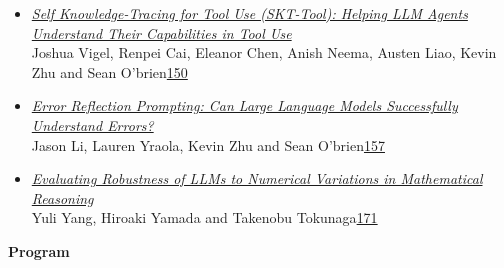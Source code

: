 \documentclass[11pt,oneside]{book}
\begin{document}
\begin{itemize}[leftmargin=*,label={}]
       \item \hyperlink{page.150}{\emph{Self Knowledge-Tracing for Tool Use (SKT-Tool): Helping LLM Agents Understand Their Capabilities in Tool Use}}\\ \hspace*{2em} Joshua Vigel, Renpei Cai, Eleanor Chen, Anish Neema, Austen Liao, Kevin Zhu and Sean O'brien\dotfill \hyperlink{page.150}{150}
       \item \hyperlink{page.157}{\emph{Error Reflection Prompting: Can Large Language Models Successfully Understand Errors?}}\\ \hspace*{2em} Jason Li, Lauren Yraola, Kevin Zhu and Sean O'brien\dotfill \hyperlink{page.157}{157}
       \item \hyperlink{page.171}{\emph{Evaluating Robustness of LLMs to Numerical Variations in Mathematical Reasoning}}\\ \hspace*{2em} Yuli Yang, Hiroaki Yamada and Takenobu Tokunaga\dotfill \hyperlink{page.171}{171}
  \end{itemize}
\newpage

{}
\renewcommand{\baselinestretch}{0.87}
\setlength{\parindent}{0in}
\setlength{\parskip}{2ex}

\begin{center}
{\Large \textbf{Program}}
\end{center}
\vspace*{0.5em}
\end{document}
